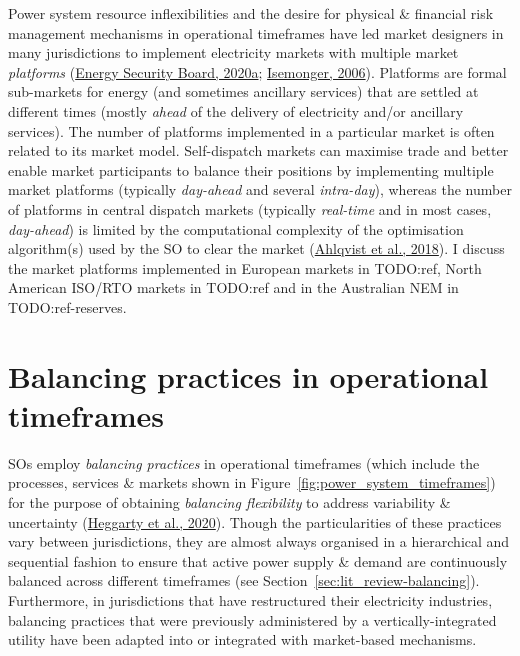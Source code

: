 \documentclass[12pt,a4paper,]{report}
\begin{document}
Power system resource inflexibilities and the desire for physical \&
financial risk management mechanisms in operational timeframes have led
market designers in many jurisdictions to implement electricity markets
with multiple market \emph{platforms}
(\protect\hyperlink{ref-energysecurityboardSystemServicesAhead2020}{Energy
Security Board, 2020a};
\protect\hyperlink{ref-isemongerBenefitsRisksVirtual2006}{Isemonger,
2006}). Platforms are formal sub-markets for energy (and sometimes
ancillary services) that are settled at different times (mostly
\emph{ahead} of the delivery of electricity and/or ancillary services).
The number of platforms implemented in a particular market is often
related to its market model. Self-dispatch markets can maximise trade
and better enable market participants to balance their positions by
implementing multiple market platforms (typically \emph{day-ahead} and
several \emph{intra-day}), whereas the number of platforms in central
dispatch markets (typically \emph{real-time} and in most cases,
\emph{day-ahead}) is limited by the computational complexity of the
optimisation algorithm(s) used by the SO to clear the market
(\protect\hyperlink{ref-ahlqvistCentralSelfDispatchElectricity2018}{Ahlqvist
et al., 2018}). I discuss the market platforms implemented in European
markets in TODO:ref, North American ISO/RTO markets in TODO:ref and in
the Australian NEM in TODO:ref-reserves.

\hypertarget{sec:lit_review-balancing_practices}{%
\section{Balancing practices in operational
timeframes}\label{sec:lit_review-balancing_practices}}

SOs employ \emph{balancing practices} in operational timeframes (which
include the processes, services \& markets shown in
Figure~\ref{fig:power_system_timeframes}) for the purpose of obtaining
\emph{balancing flexibility} to address variability \& uncertainty
(\protect\hyperlink{ref-heggartyQuantifyingPowerSystem2020}{Heggarty et
al., 2020}). Though the particularities of these practices vary between
jurisdictions, they are almost always organised in a hierarchical and
sequential fashion to ensure that active power supply \& demand are
continuously balanced across different timeframes (see
Section~\ref{sec:lit_review-balancing}). Furthermore, in jurisdictions
that have restructured their electricity industries, balancing practices
that were previously administered by a vertically-integrated utility
have been adapted into or integrated with market-based mechanisms.
\end{document}
